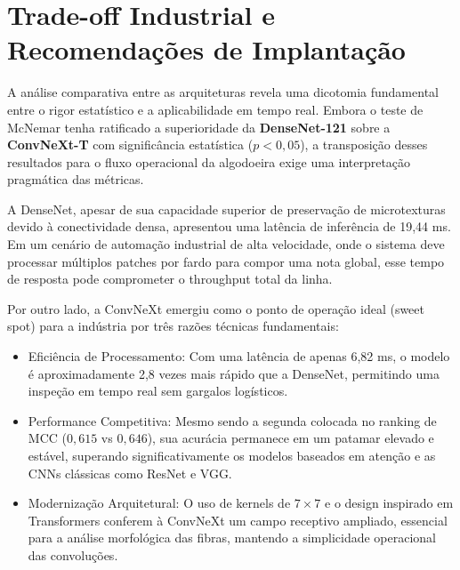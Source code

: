 \section{Trade-off Industrial e Recomendações de Implantação}





A análise comparativa entre as arquiteturas revela uma dicotomia fundamental entre o rigor estatístico e a aplicabilidade em tempo real. Embora o teste de McNemar tenha ratificado a superioridade da \textbf{DenseNet-121} sobre a \textbf{ConvNeXt-T} com significância estatística ($p < 0,05$), a transposição desses resultados para o fluxo operacional da algodoeira exige uma interpretação pragmática das métricas.

A DenseNet, apesar de sua capacidade superior de preservação de microtexturas devido à conectividade densa, apresentou uma latência de inferência de 19,44 ms. Em um cenário de automação industrial de alta velocidade, onde o sistema deve processar múltiplos patches por fardo para compor uma nota global, esse tempo de resposta pode comprometer o throughput total da linha.

Por outro lado, a ConvNeXt emergiu como o ponto de operação ideal (sweet spot) para a indústria por três razões técnicas fundamentais:

\begin{itemize}
    \item Eficiência de Processamento: Com uma latência de apenas 6,82 ms, o modelo é aproximadamente 2,8 vezes mais rápido que a DenseNet, permitindo uma inspeção em tempo real sem gargalos logísticos.
    \item Performance Competitiva: Mesmo sendo a segunda colocada no ranking de MCC ($0,615$ vs $0,646$), sua acurácia permanece em um patamar elevado e estável, superando significativamente os modelos baseados em atenção e as CNNs clássicas como ResNet e VGG.
    \item Modernização Arquitetural: O uso de kernels de $7\times7$ e o design inspirado em Transformers conferem à ConvNeXt um campo receptivo ampliado, essencial para a análise morfológica das fibras, mantendo a simplicidade operacional das convoluções.
\end{itemize}

